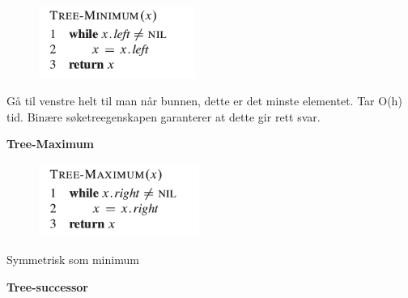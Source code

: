 \documentclass[12pt]{report}
\begin{document}

\begin{figure}[H]
	\begin{Center}
		\includegraphics[width=2.01in,height=0.92in]{./media/image80.png}
	\end{Center}
\end{figure}



\par

Gå til venstre helt til man når bunnen, dette er det minste elementet. Tar O(h) tid. Binære søketreegenskapen garanterer at dette gir rett svar. \par

{\fontsize{14pt}{16.8pt}\selectfont \textbf{Tree-Maximum}\par}\par




\begin{figure}[H]
	\begin{Center}
		\includegraphics[width=2.06in,height=0.95in]{./media/image81.png}
	\end{Center}
\end{figure}



\par

Symmetrisk som minimum\par


\vspace{\baselineskip}

\vspace{\baselineskip}
{\fontsize{14pt}{16.8pt}\selectfont \textbf{Tree-successor}\par}\par
\end{document}
